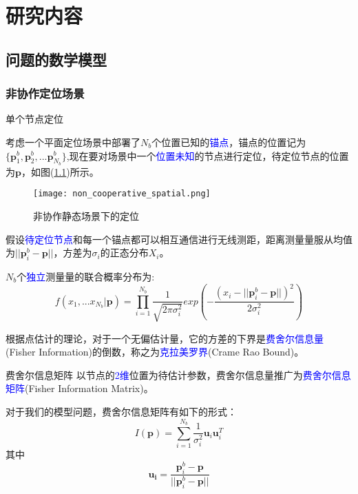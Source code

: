 \chapter{研究内容}
\label{cha:content}

\section{问题的数学模型}

\subsection[非协作定位场景]{非协作定位场景}

{单个节点定位}

        考虑一个平面定位场景中部署了$N_b$个位置已知的\textcolor{blue}{锚点}，锚点的位置记为$\{\bm{p}^b_1,\bm{p}^b_2,...\bm{p}^b_{N_b}\}$,现在要对场景中一个\textcolor{blue}{位置未知}的节点进行定位，待定位节点的位置为$\bm{p}$，如图(\ref{fig:non_cooperative_spatial})所示。
        \begin{figure}
          \centering
          \texttt{[image: non\_cooperative\_spatial.png]}
          \caption{非协作静态场景下的定位}\label{fig:non_cooperative_spatial}
        \end{figure}
假设\textcolor{blue}{待定位节点}和每一个锚点都可以相互通信进行无线测距，距离测量量服从均值为$||\bm{p}^b_i-\bm{p}||$，方差为$\sigma_i$的正态分布$X_i$。

$N_b$个\textcolor{blue}{独立}测量量的联合概率分布为:
\begin{equation}\label{eq:single}
f(x_1,...x_{N_b}|\textbf{p})=\prod_{i=1}^{N_b}\frac{1}{\sqrt{2\pi\sigma_i^2}}exp(-\frac{(x_i-||\bm{p}^b_i-\bm{p}||)^2}{2\sigma_i^2})
\end{equation}

根据点估计的理论，对于一个无偏估计量，它的方差的下界是\textcolor{blue}{费舍尔信息量}(Fisher Information)的倒数，称之为\textcolor{blue}{克拉美罗界}(Crame Rao Bound)。


{费舍尔信息矩阵}
以节点的\textcolor{blue}{2维}位置为待估计参数，费舍尔信息量推广为\textcolor{blue}{费舍尔信息矩阵}(Fisher Information Matrix)。

对于我们的模型问题，费舍尔信息矩阵有如下的形式：
\begin{equation}\label{eq:uu}
I(\bm{p})=\displaystyle\sum_{i=1}^{N_b}\frac{1}{\sigma_i^2}\bm{u}_i\bm{u}_i^T
\end{equation}
其中
\begin{equation}
\bm{u_i}=\frac{\bm{p}^b_i-\bm{p}}{||\bm{p}^b_i-\bm{p}||}
\end{equation}


